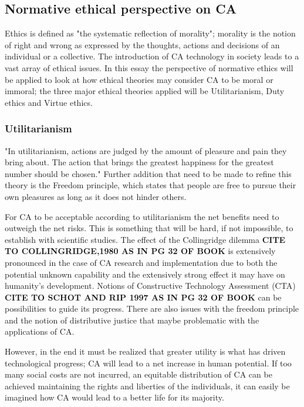 \subsection{Normative ethical perspective on CA}

Ethics is defined as "the systematic reflection of morality"\cite[ch. 3.2]{Ethics_textbook}; morality is the notion of right and wrong as expressed by the thoughts, actions and decisions of an individual or a collective. The introduction of CA technology in society leads to a vast array of ethical issues. In this essay the perspective of normative ethics will be applied to look at how ethical theories may consider CA to be moral or immoral; the three major ethical theories applied will be Utilitarianism, Duty ethics and Virtue ethics.

\subsubsection{Utilitarianism}

"In utilitarianism, actions are judged by the amount of pleasure and pain they bring about. The action that brings the greatest happiness for the greatest number should be chosen." \cite[ch. 3.7]{Ethics_textbook} Further addition that need to be made to refine this theory is the Freedom principle, which states that people are free to pursue their own pleasures as long as it does not hinder others. 

For CA to be acceptable according to utilitarianism the net benefits need to outweigh the net risks. This is something that will be hard, if not impossible, to establish with scientific studies. The effect of the Collingridge dilemma {\bf CITE TO COLLINGRIDGE,1980 AS IN PG 32 OF BOOK} is extensively pronounced in the case of CA research and implementation due to both the potential unknown capability and the extensively strong effect it may have on humanity's development. Notions of Constructive Technology Assessment (CTA) {\bf CITE TO SCHOT AND RIP 1997 AS IN PG 32 OF BOOK} can be possibilities to guide its progress. There are also issues with the freedom principle and the notion of distributive justice that maybe problematic with the applications of CA. 

However, in the end it must be realized that greater utility is what has driven technological progress; CA will lead to a net increase in human potential. If too many social costs are not incurred, an equitable distribution of CA can be achieved maintaining the rights and liberties of the individuals, it can easily be imagined how CA would lead to a better life for its majority.

